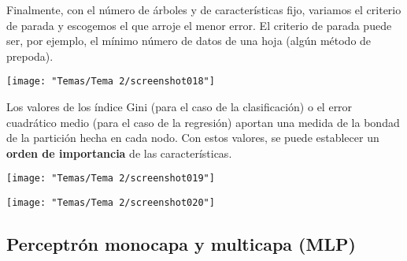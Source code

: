 \begin{minipage}{0.4\textwidth}
Finalmente, con el número de árboles
y de características fijo, variamos el
criterio de parada y escogemos el que
arroje el menor error. El criterio de
parada puede ser, por ejemplo, el
mínimo número de datos de una hoja
(algún método de prepoda).
\end{minipage}\qquad\begin{minipage}{0.55\textwidth}
\begin{center}
	\texttt{[image: "Temas/Tema 2/screenshot018"]}
\end{center}

\end{minipage}
\begin{minipage}{0.5\textwidth}
	Los valores de los índice Gini (para el caso de la clasificación)
o el error cuadrático medio (para el caso de la regresión)
aportan una medida de la bondad de la partición hecha en
cada nodo. Con estos valores, se puede establecer un \textbf{orden de importancia} de las características. 
\end{minipage}\qquad\begin{minipage}{0.5\textwidth}
\begin{center}
	\texttt{[image: "Temas/Tema 2/screenshot019"]}
\end{center}
\end{minipage}
\begin{center}
	\texttt{[image: "Temas/Tema 2/screenshot020"]}
\end{center}
\subsection{Perceptrón monocapa y multicapa (MLP)}
